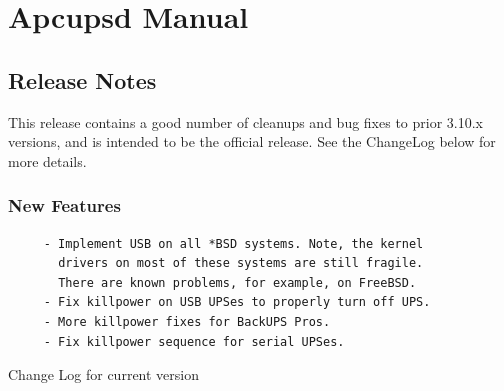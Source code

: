 
\section*{Apcupsd Manual}
\label{_ChapterStart}

\label{Release-Notes}

\subsection*{Release Notes}

\label{index-Release-Notes-1}
This release contains a good number of cleanups and bug fixes to prior 3.10.x
versions, and is intended to be the official release. See the ChangeLog below
for more details. 

\label{New-Features}

\subsubsection*{New Features}

\label{index-New-Features-2}

\footnotesize
\begin{verbatim}
     - Implement USB on all *BSD systems. Note, the kernel
       drivers on most of these systems are still fragile.
       There are known problems, for example, on FreeBSD.
     - Fix killpower on USB UPSes to properly turn off UPS.
     - More killpower fixes for BackUPS Pros.
     - Fix killpower sequence for serial UPSes.
\end{verbatim}
\normalsize

Change Log for current version 


